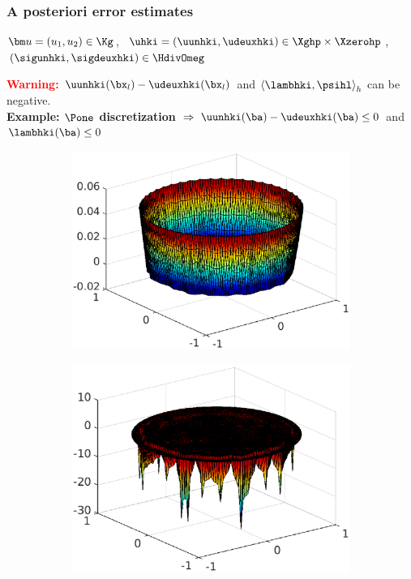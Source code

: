\documentclass{beamer}
\begin{document}
\begin{frame}
\frametitle{A posteriori error estimates}
\vspace{-0.1cm}
${\bm u}=(u_1,u_2)\in\Kg$,\ $\uhki=(\uunhki,\udeuxhki)\in \Xghp \times \Xzerohp$, $\left(\sigunhki, \sigdeuxhki\right) \in \HdivOmeg$

\textcolor{red}{\textbf{Warning:}}
$\uunhki(\bx_l) - \udeuxhki(\bx_l)$ and $\left\langle \lambhki ,\psihl \right\rangle_h$ can be negative.
\\
\textcolor{cadmiumgreen}{\textbf{Example: $\Pone$ discretization}} $\Rightarrow \  \uunhki(\ba)-\udeuxhki(\ba) \leq 0$ and $\lambhki(\ba) \leq 0$ 
 
\vspace{-0.3 cm}
\begin{figure}[H]
\begin{subfigure}[normal]{0.32\textwidth} 
\includegraphics[width=\textwidth]{fig_article/fig_diff_u1_u2_newton_iter_4.eps}    
\label{ref:position_membrane_inside_iter}
\end{subfigure}
\begin{subfigure}[normal]{0.32\textwidth}
\includegraphics[width=\textwidth]{fig_article/fig_lambda_newton_iter_4.eps}     

\end{subfigure}
\end{figure}
\end{frame}
\end{document}
